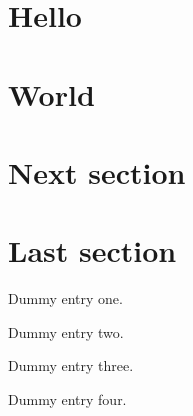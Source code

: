 \documentclass{article}
\begin{document}
\section{Hello}
\cite{ref1, ref2, ref3, ref4}
\section{World}
\cite{ref1, ref3}
\newpage
\section{Next section}
\cite{ref1}
\newpage
\section{Last section}
\cite{ref1, ref2}
\newpage

\begin{thebibliography}{99}
 Dummy entry one.

 Dummy entry two.

 Dummy entry three.

 Dummy entry four.

\end{thebibliography}
\end{document}
